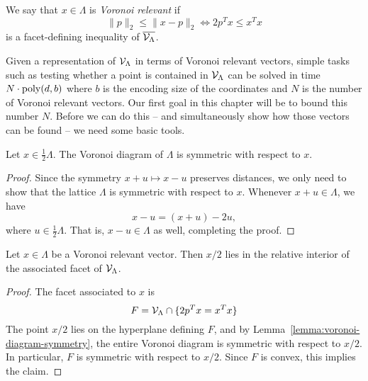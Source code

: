 \begin{definition}
  We say that $x \in \Lambda$ is \emph{Voronoi relevant} if
  \[
    \| p \|_2 \leq \| x - p \|_2 \iff 2p^Tx \leq x^T x
  \]
  is a facet-defining inequality of $\overline{\mathcal{V}_\Lambda}$.
\end{definition}

Given a representation of $\mathcal{V}_\Lambda$ in terms of Voronoi relevant vectors,
simple tasks such as testing whether a point is contained in $\mathcal{V}_\Lambda$
can be solved in time $N \cdot \operatorname{poly}(d, b)$
where $b$ is the encoding size of the coordinates
and $N$ is the number of Voronoi relevant vectors.
Our first goal in this chapter will be to bound this number $N$.
Before we can do this -- and simultaneously show how those vectors
can be found -- we need some basic tools.

\begin{lemma}
  \label{lemma:voronoi-diagram-symmetry}
  Let $x \in \frac{1}{2} \Lambda$.
  The Voronoi diagram of $\Lambda$ is symmetric with respect to $x$.
\end{lemma}
\begin{proof}
  Since the symmetry $x + u \mapsto x - u$ preserves distances,
  we only need to show that the lattice $\Lambda$ is symmetric with respect to $x$.
  Whenever $x + u \in \Lambda$, we have
  \[
    x - u = (x + u) - 2u,
  \]
  where $u \in \frac{1}{2} \Lambda$.
  That is, $x - u \in \Lambda$ as well, completing the proof.
\end{proof}

\begin{lemma}
  \label{lemma:voronoi-relevant-facet-interior}
  Let $x \in \Lambda$ be a Voronoi relevant vector.
  Then $x/2$ lies in the relative interior of the associated facet of $\mathcal{V}_\Lambda$.
\end{lemma}
\begin{proof}
  The facet associated to $x$ is
  \[
    F = \mathcal{V}_\Lambda \cap \{ 2p^Tx = x^Tx \}
  \]
  The point $x/2$ lies on the hyperplane defining $F$,
  and by Lemma~\ref{lemma:voronoi-diagram-symmetry},
  the entire Voronoi diagram is symmetric with respect to $x/2$.
  In particular, $F$ is symmetric with respect to $x/2$.
  Since $F$ is convex, this implies the claim.
\end{proof}

